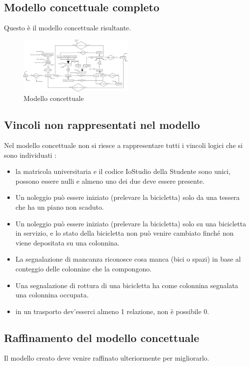 \documentclass[a4paper,twoside]{article}
\begin{document}
\subsection{Modello concettuale completo}
Questo è il modello concettuale risultante.
\begin{figure}[H]
 \centering
  \includegraphics[width=0.5\textwidth]{Immagini-Grafici/Concettuale14.png}
\caption{Modello concettuale}
\end{figure}

\subsection{Vincoli non rappresentati nel modello}
Nel modello concettuale non si riesce a rappresentare tutti i vincoli logici che si sono individuati :
\begin{itemize} %
 \item la matricola universitaria e il codice IoStudio della Studente sono unici, possono essere nulli e almeno uno dei due deve essere presente.
 \item Un noleggio può essere iniziato (prelevare la bicicletta) solo da una tessera che ha un piano non scaduto.
 \item Un noleggio può essere iniziato (prelevare la bicicletta) solo su una bicicletta in servizio, e lo stato della bicicletta non può venire cambiato finché non viene depositata su una colonnina.
 \item La segnalazione di mancanza riconosce cosa manca (bici o spazi) in base al conteggio delle colonnine che la compongono.
 \item Una segnalazione di rottura di una bicicletta ha come colonnina segnalata una colonnina occupata.
 \item in un trasporto dev'esserci almeno 1 relazione, non è possibile 0.
\end{itemize}

\subsection{Raffinamento del modello concettuale}
Il modello creato deve venire raffinato ulteriormente per migliorarlo.\newline
\end{document}
